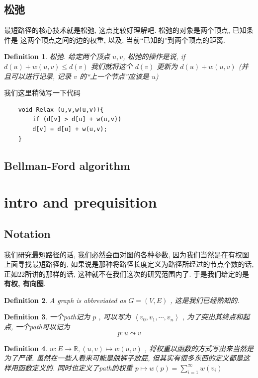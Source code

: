 \documentclass[a4paper, 10pt]{ctexart} %
\newtheorem{definition}{Definition}
\begin{document}
\subsection{松弛} %
\label{sub:松弛}
最短路径的核心技术就是松弛, 这点比较好理解吧. 松弛的对象是两个顶点, 已知条件是
这两个顶点之间的边的权重, 以及, 当前``已知的''到两个顶点的距离.
\begin{definition}
松弛. 给定两个顶点 $ u ,v$, 松弛的操作是说, if $ d \left( u\right) + w \left( u , v\right) \le d \left( v\right)$
我们就将这个 $d \left(v\right)$ 更新为 
$d \left(u \right) + w \left( u, v\right)$ (并且可以进行记录, 记录 $v$ 的``上一个节点''应该是 $u$)
\end{definition}
我们这里稍微写一下代码
\begin{verbatim}
    void Relax (u,v,w(u,v)){
        if (d[v] > d[u] + w(u,v))
        d[v] = d[u] + w(u,v);
    }
\end{verbatim}
\subsection{Bellman-Ford algorithm} %
\label{sub:Bellman-Ford algorithm}

\section{intro and prequisition}
\subsection{Notation}

我们研究最短路径的话, 我们必然会面对图的各种参数, 因为我们当然是在有权图上面寻找最短路径的, 如果说是那种将路径长度定义为路径所经过的节点个数的话, 正如22所讲的那样的话, 
这种就不在我们这次的研究范围内了. 于是我们给定的是 {\bf 有权, 有向图}. 

\begin{definition}
    A graph is abbreviated as $G  = \left(V, E\right)$ , 这是我们已经熟知的. 
\end{definition}

\begin{definition}
一个path记为 $p$ , 可以写为 $\left< v_{0}, v_{1}, \cdots , v_{n}\right>$ , 为了突出其终点和起点, 一个path可以记为
$$p: u \leadsto v$$
\end{definition}

\begin{definition}
$w : E \to \mathbb{R}, \left(u , v\right) \mapsto w \left(u , v\right)$ , 将权重以函数的方式写出来当然是为了严谨. 
虽然在一些人看来可能是脱裤子放屁, 但其实有很多东西的定义都是这样用函数定义的. 同时也定义了path的权重 $p \mapsto w \left( p\right) = \sum\limits_{i=1} ^{\infty} w \left( v_{i}\right)$
\end{definition}
\end{document}
